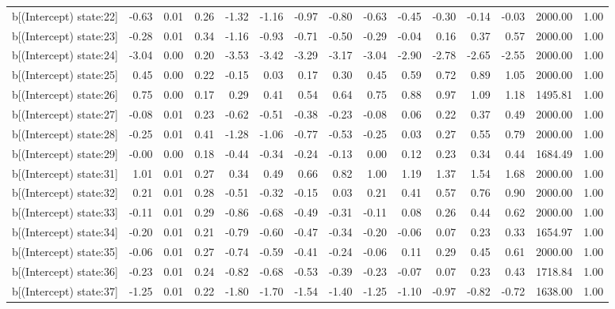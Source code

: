 \begin{table}[ht]
\begin{tabular}{rrrrrrrrrrrrrrr}
  b[(Intercept) state:22] & -0.63 & 0.01 & 0.26 & -1.32 & -1.16 & -0.97 & -0.80 & -0.63 & -0.45 & -0.30 & -0.14 & -0.03 & 2000.00 & 1.00 \\ 
  b[(Intercept) state:23] & -0.28 & 0.01 & 0.34 & -1.16 & -0.93 & -0.71 & -0.50 & -0.29 & -0.04 & 0.16 & 0.37 & 0.57 & 2000.00 & 1.00 \\ 
  b[(Intercept) state:24] & -3.04 & 0.00 & 0.20 & -3.53 & -3.42 & -3.29 & -3.17 & -3.04 & -2.90 & -2.78 & -2.65 & -2.55 & 2000.00 & 1.00 \\ 
  b[(Intercept) state:25] & 0.45 & 0.00 & 0.22 & -0.15 & 0.03 & 0.17 & 0.30 & 0.45 & 0.59 & 0.72 & 0.89 & 1.05 & 2000.00 & 1.00 \\ 
  b[(Intercept) state:26] & 0.75 & 0.00 & 0.17 & 0.29 & 0.41 & 0.54 & 0.64 & 0.75 & 0.88 & 0.97 & 1.09 & 1.18 & 1495.81 & 1.00 \\ 
  b[(Intercept) state:27] & -0.08 & 0.01 & 0.23 & -0.62 & -0.51 & -0.38 & -0.23 & -0.08 & 0.06 & 0.22 & 0.37 & 0.49 & 2000.00 & 1.00 \\ 
  b[(Intercept) state:28] & -0.25 & 0.01 & 0.41 & -1.28 & -1.06 & -0.77 & -0.53 & -0.25 & 0.03 & 0.27 & 0.55 & 0.79 & 2000.00 & 1.00 \\ 
  b[(Intercept) state:29] & -0.00 & 0.00 & 0.18 & -0.44 & -0.34 & -0.24 & -0.13 & 0.00 & 0.12 & 0.23 & 0.34 & 0.44 & 1684.49 & 1.00 \\ 
  b[(Intercept) state:31] & 1.01 & 0.01 & 0.27 & 0.34 & 0.49 & 0.66 & 0.82 & 1.00 & 1.19 & 1.37 & 1.54 & 1.68 & 2000.00 & 1.00 \\ 
  b[(Intercept) state:32] & 0.21 & 0.01 & 0.28 & -0.51 & -0.32 & -0.15 & 0.03 & 0.21 & 0.41 & 0.57 & 0.76 & 0.90 & 2000.00 & 1.00 \\ 
  b[(Intercept) state:33] & -0.11 & 0.01 & 0.29 & -0.86 & -0.68 & -0.49 & -0.31 & -0.11 & 0.08 & 0.26 & 0.44 & 0.62 & 2000.00 & 1.00 \\ 
  b[(Intercept) state:34] & -0.20 & 0.01 & 0.21 & -0.79 & -0.60 & -0.47 & -0.34 & -0.20 & -0.06 & 0.07 & 0.23 & 0.33 & 1654.97 & 1.00 \\ 
  b[(Intercept) state:35] & -0.06 & 0.01 & 0.27 & -0.74 & -0.59 & -0.41 & -0.24 & -0.06 & 0.11 & 0.29 & 0.45 & 0.61 & 2000.00 & 1.00 \\ 
  b[(Intercept) state:36] & -0.23 & 0.01 & 0.24 & -0.82 & -0.68 & -0.53 & -0.39 & -0.23 & -0.07 & 0.07 & 0.23 & 0.43 & 1718.84 & 1.00 \\ 
  b[(Intercept) state:37] & -1.25 & 0.01 & 0.22 & -1.80 & -1.70 & -1.54 & -1.40 & -1.25 & -1.10 & -0.97 & -0.82 & -0.72 & 1638.00 & 1.00 \\ 

\end{tabular}
\end{table}

